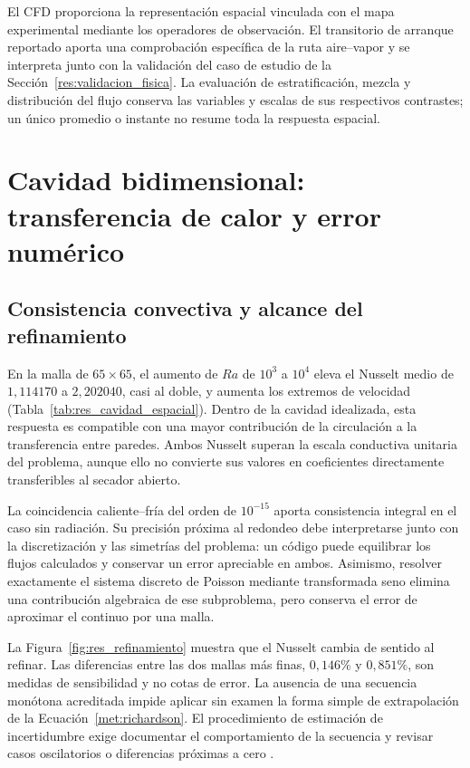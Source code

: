 El CFD proporciona la representación espacial vinculada con el mapa experimental mediante los operadores de observación. El transitorio de arranque reportado aporta una comprobación específica de la ruta aire--vapor y se interpreta junto con la validación del caso de estudio de la Sección~\ref{res:validacion_fisica}. La evaluación de estratificación, mezcla y distribución del flujo conserva las variables y escalas de sus respectivos contrastes; un único promedio o instante no resume toda la respuesta espacial.
\FloatBarrier

\section{Cavidad bidimensional: transferencia de calor y error numérico}
\label{dis:cavidad}

\subsection{Consistencia convectiva y alcance del refinamiento}

En la malla de $65\times65$, el aumento de $Ra$ de $10^3$ a $10^4$ eleva el Nusselt medio de $1{,}114170$ a $2{,}202040$, casi al doble, y aumenta los extremos de velocidad (Tabla~\ref{tab:res_cavidad_espacial}). Dentro de la cavidad idealizada, esta respuesta es compatible con una mayor contribución de la circulación a la transferencia entre paredes. Ambos Nusselt superan la escala conductiva unitaria del problema, aunque ello no convierte sus valores en coeficientes directamente transferibles al secador abierto.

La coincidencia caliente--fría del orden de $10^{-15}$ aporta consistencia integral en el caso sin radiación. Su precisión próxima al redondeo debe interpretarse junto con la discretización y las simetrías del problema: un código puede equilibrar los flujos calculados y conservar un error apreciable en ambos. Asimismo, resolver exactamente el sistema discreto de Poisson mediante transformada seno elimina una contribución algebraica de ese subproblema, pero conserva el error de aproximar el continuo por una malla.

La Figura~\ref{fig:res_refinamiento} muestra que el Nusselt cambia de sentido al refinar. Las diferencias entre las dos mallas más finas, $0{,}146\%$ y $0{,}851\%$, son medidas de sensibilidad y no cotas de error. La ausencia de una secuencia monótona acreditada impide aplicar sin examen la forma simple de extrapolación de la Ecuación~\eqref{met:richardson}. El procedimiento de estimación de incertidumbre exige documentar el comportamiento de la secuencia y revisar casos oscilatorios o diferencias próximas a cero \cite{celik2008}.

